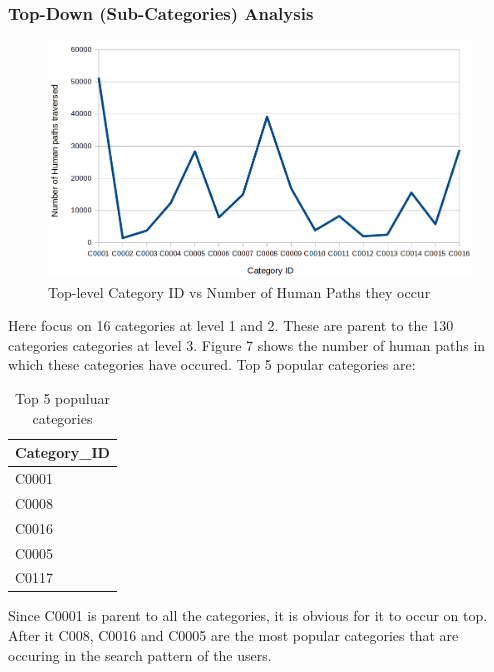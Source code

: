 \documentclass[12pt]{article}
\begin{document}
\subsubsection{Top-Down (Sub-Categories) Analysis}
\begin{figure}[h]
    \centering
    \includegraphics[scale = 0.47]{images/q9_paths.png}
    \caption{Top-level Category ID vs Number of Human Paths they occur}
\end{figure}
 Here focus on 16 categories at level 1 and 2. These are parent to the 130 categories categories at level 3. Figure 7 shows the number of human paths in which these categories have occured. Top 5 popular categories are:
\begin{table}[h]
\centering
\begin{tabular}{|l|}
\hline
Category\_ID \\ \hline
C0001        \\
C0008        \\
C0016        \\
C0005        \\
C0117        \\ \hline
\end{tabular}
\caption{Top 5 populuar categories}
\end{table}
Since C0001 is parent to all the categories, it is obvious for it to occur on top. After it C008, C0016 and C0005 are the most popular categories that are occuring in the search pattern of the users.
\pagebreak
\end{document}
